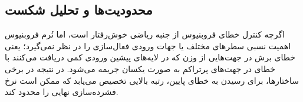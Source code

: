 \subsection{محدودیت‌ها و تحلیل شکست}
اگرچه کنترل خطای فروبنیوس از جنبه ریاضی خوش‌رفتار است، اما نُرم فروبنیوس اهمیت نسبی سطرهای مختلف یا جهات ورودی فعال‌سازی را در نظر نمی‌گیرد؛ یعنی خطای برش در جهت‌هایی از وزن که در لایه‌های پیشین ورودی کمی دریافت می‌کنند با خطای در جهت‌های پرتراکم به صورت یکسان جریمه می‌شود. در نتیجه در برخی ساختارها، برای رسیدن به خطای پایین، رتبه بالایی تخصیص می‌یابد که ممکن است نرخ فشرده‌سازی نهایی را محدود کند.
